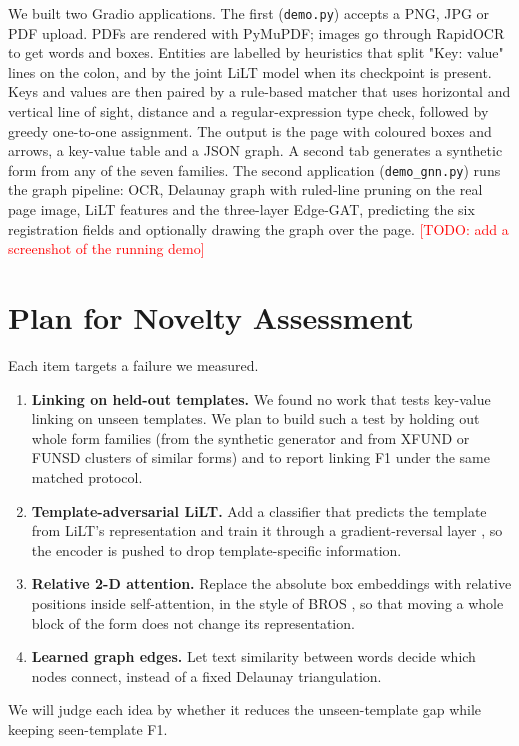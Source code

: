 \documentclass[11pt,a4paper]{article}
\newcommand{\todo}[1]{\textcolor{red}{[TODO: #1]}}
\begin{document}
We built two Gradio applications. The first (\texttt{demo.py}) accepts a PNG, JPG or PDF upload. PDFs are rendered with PyMuPDF; images go through RapidOCR to get words and boxes. Entities are labelled by heuristics that split "Key: value" lines on the colon, and by the joint LiLT model when its checkpoint is present. Keys and values are then paired by a rule-based matcher that uses horizontal and vertical line of sight, distance and a regular-expression type check, followed by greedy one-to-one assignment. The output is the page with coloured boxes and arrows, a key-value table and a JSON graph. A second tab generates a synthetic form from any of the seven families. The second application (\texttt{demo\_gnn.py}) runs the graph pipeline: OCR, Delaunay graph with ruled-line pruning on the real page image, LiLT features and the three-layer Edge-GAT, predicting the six registration fields and optionally drawing the graph over the page. \todo{add a screenshot of the running demo}

\section{Plan for Novelty Assessment}

Each item targets a failure we measured.
\begin{enumerate}
  \item \textbf{Linking on held-out templates.} We found no work that tests key-value linking on unseen templates. We plan to build such a test by holding out whole form families (from the synthetic generator and from XFUND or FUNSD clusters of similar forms) and to report linking F1 under the same matched protocol.
  \item \textbf{Template-adversarial LiLT.} Add a classifier that predicts the template from LiLT's representation and train it through a gradient-reversal layer \cite{dann}, so the encoder is pushed to drop template-specific information.
  \item \textbf{Relative 2-D attention.} Replace the absolute box embeddings with relative positions inside self-attention, in the style of BROS \cite{bros}, so that moving a whole block of the form does not change its representation.
  \item \textbf{Learned graph edges.} Let text similarity between words decide which nodes connect, instead of a fixed Delaunay triangulation.
\end{enumerate}
We will judge each idea by whether it reduces the unseen-template gap while keeping seen-template F1.
\end{document}
